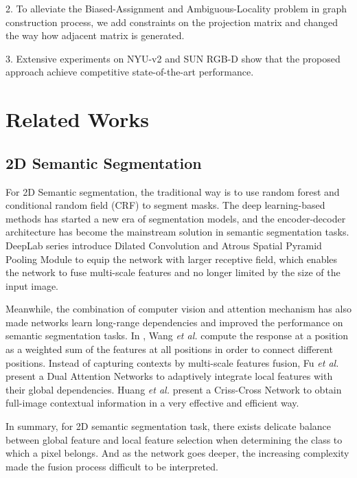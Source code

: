 ﻿\documentclass[journal]{IEEEtran}
\begin{document}
    2. To alleviate the Biased-Assignment and Ambiguous-Locality problem in graph construction process, we add constraints on the projection matrix and changed the way how adjacent matrix is generated.

    3. Extensive experiments on NYU-v2 and SUN RGB-D show that the proposed approach achieve competitive state-of-the-art performance. 

\section{Related Works} \label{sec_related}

\subsection{2D Semantic Segmentation}

 
    For 2D Semantic segmentation, the traditional way is to use random forest and conditional random field (CRF) to segment masks. The deep learning-based methods \cite{long2015fully} has started a new era of segmentation models, and the encoder-decoder architecture has become the mainstream solution in semantic segmentation tasks\cite{unet}. DeepLab series \cite{chen2017deeplab}\cite{cheng2020panoptic} introduce Dilated Convolution and Atrous Spatial Pyramid Pooling Module to equip the network with larger receptive field, which enables the network to fuse multi-scale features and no longer limited by the size of the input image. 
    
 
    Meanwhile, the combination of computer vision and attention mechanism has also made networks learn long-range dependencies and improved the performance on semantic segmentation tasks. In \cite{NonLocal2018}, Wang \emph{et al.} compute the response at a position as a weighted sum of the features at all positions in order to connect different positions. Instead of capturing contexts by multi-scale features fusion, Fu \emph{et al.} \cite{fu2019dual} present a Dual Attention Networks to adaptively integrate local features with their global dependencies. Huang \emph{et al.} \cite{huang2018ccnet} present a Criss-Cross Network to obtain full-image contextual information in a very effective and efficient way.
    
 
    In summary, for 2D semantic segmentation task, there exists delicate balance between global feature and local feature selection when determining the class to which a pixel belongs. And as the network goes deeper, the increasing complexity made the fusion process difficult to be interpreted.
    
\end{document}
